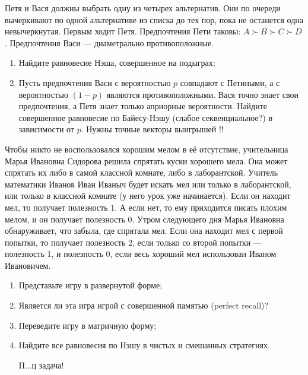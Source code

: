 \begin{problem}[Вето]
Петя и Вася должны выбрать одну из четырех альтернатив. Они по очереди вычеркивают по одной альтернативе из списка до тех пор, пока не останется одна невычеркнутая. Первым ходит Петя. Предпочтения Пети таковы:  $A\succ B\succ C\succ D$. Предпочтения Васи — диаметрально противоположные.\par
\begin{enumerate}
\item Найдите равновесие Нэша, совершенное на подыграх;\par
\item Пусть предпочтения Васи с вероятностью  $p$  совпадают с Петиными, а с вероятностью  $\left(1-p\right)$  являются противоположными. Вася точно знает свои предпочтения, а Петя знает только априорные вероятности. Найдите совершенное равновесие по Байесу-Нэшу ({\red слабое секвенциальное?}) в зависимости от $p$. {\red Нужны точные векторы выигрышей !!}\par
\end{enumerate}



\begin{sol}

\end{sol}
\end{problem}



\begin{problem}
Чтобы никто не воспользовался хорошим мелом в её отсутствие, учительница Марь{\red я} Ивановна Сидорова решила спрятать куски хорошего мела. Она может спрятать их либо в самой классной комнате, либо в лаборантской. Учитель математики Иванов Иван Иваныч будет искать мел или только в лаборантской, или только в классной комнате (у него урок уже начинается). Если он находит мел, то получает полезность 1. А если нет, то ему приходится писать плохим мелом, и он получает полезность 0. Утром следующего дня Марь{\red я} Ивановна обнаруживает, что забыла, где спрятала мел. Если она находит мел с первой попытки, то получает полезность 2, если только со второй попытки — полезность 1, и полезность 0, если весь хороший мел использован Иваном Ивановичем.\par
\begin{enumerate}
\item Представьте игру в развернутой форме;\par
\item Является ли эта игра игрой с совершенной памятью (perfect recall)?\par
\item  Переведите игру в матричную форму;\par
\item Найдите все равновесия по Нэшу в чистых и смешанных стратегиях.\par
{\red П...ц задача!}
\end{enumerate}


\begin{sol}

\end{sol}
\end{problem}



